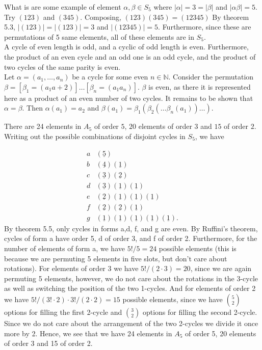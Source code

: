 \documentclass{article}
\newcommand{\N}{\mathbb{N}}
\begin{document}
 What is are some example of element $\alpha,\beta\in S_5$ where $|\alpha| = 3 = |\beta|$ and $|\alpha\beta| = 5$.\\
 Try $(123)$ and $(345)$. Composing, $(123)(345) = (12345)$ By theorem 5.3, $|(123)| = |(123)| = 3$ and $|(12345)| = 5$. Furthermore, since these are permutations of 5 same elements, all of these elements are in $S_5$.\\

 A cycle of even length is odd, and a cyclic of odd length is even. Furthermore, the product of an even cycle and an odd one is an odd cycle, and the product of two cycles of the same parity is even.\\
 Let $\alpha = (a_1,\dots,a_n)$ be a cycle for some even $n\in \N$. Consider the permutation $\beta = [\beta_1=(a_1a+2)]\dots[\beta_n = (a_1a_n)]$. $\beta$ is even, as there it is represented here as a product of an even number of two cycles. It remains to be shown that $\alpha = \beta$. Then $\alpha(a_1) = a_2$ and $\beta(a_1) = \beta_1(\beta_2(\dots\beta_n(a_1))\dots).$

 There are 24 elements in $A_5$ of order $5$, $20$ elements of order $3$ and $15$ of order $2$.\\

 Writing out the possible combinations of disjoint cycles in $S_5$, we have 

$$
\begin{array}{cc}
     a&  (\underline{5})\\
    b & (\underline{4})(\underline{1})\\
    c & (\underline{3})(\underline{2})\\
    d & (\underline{3})(\underline{1})(\underline{1})\\
    e & (\underline{2})(\underline{1})(\underline{1})(\underline{1})\\
    f & (\underline{2})(\underline{2})(\underline{1})\\
    g & (\underline{1})(\underline{1})(\underline{1})(\underline{1})(\underline{1}).
\end{array}
$$
By theorem 5.5, only cycles in forms a,d, f, and g are even. By Ruffini's theorem, cycles of form a have order 5, d of order 3, and f of order 2. Furthermore, for the number of elements of form a, we have $5!/5 = 24$ possible elements (this is because we are permuting 5 elements in five slots, but don't care about rotations). For elements of order 3 we have $5!/(2\cdot 3)=20$, since we are again permuting 5 elements, however, we do not care about the rotations in the 3-cycle as well as switching the position of the two 1-cycles. And for elements of order 2 we have $5!/(3!\cdot 2) \cdot 3!/(2\cdot 2)=15$ possible elements, since we have $\binom{5}{2}$ options for filling the first 2-cycle and $\binom{3}{2}$ options for filling the second 2-cycle. Since we do not care about the arrangement of the two 2-cycles we divide it once more by 2. Hence, we see that we have 24 elements in $A_5$ of order 5, 20 elements of order 3 and 15 of order 2. 
\\
\end{document}
